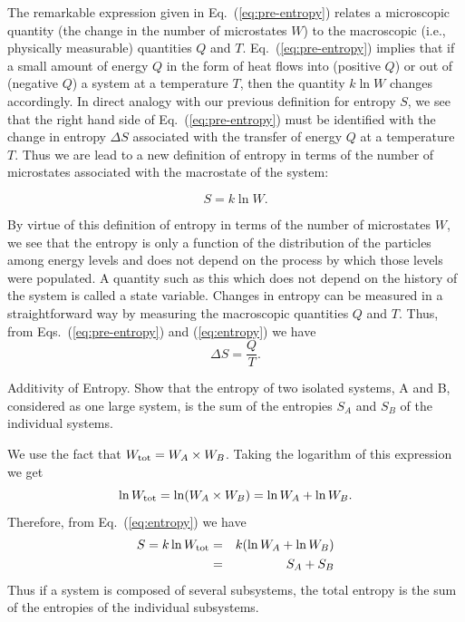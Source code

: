 The remarkable expression given in Eq.~(\ref{eq:pre-entropy}) relates
a microscopic quantity (the change in the number of microstates $W$)
to the macroscopic (i.e., physically measurable) quantities $Q$ and
$T$.  Eq.~(\ref{eq:pre-entropy}) implies that if a small amount of
energy $Q$ in the form of heat flows into (positive $Q$) or out of
(negative $Q$) a system at a temperature $T$, then the quantity $k \ln
W$ changes accordingly.  In direct analogy with our previous
definition for entropy $S$, we see that the right hand side of
Eq.~(\ref{eq:pre-entropy}) must be identified with the change in
entropy $\Delta S$ associated with the transfer of energy $Q$ at a
temperature $T$.  Thus we are lead to a new definition of entropy in
terms of the number of microstates associated with the macrostate of
the system:

\begin{boxiteq}
{
\begin{equation}
S = k \ln W.
\label{eq:entropy}
\end{equation}
}
\end{boxiteq}
\vspace{-.1in}

By virtue of this definition of entropy in terms of the number of
microstates $W$, we see that the entropy is only a function of the
distribution of the particles among energy levels and does not depend
on the process by which those levels were populated.  A quantity such
as this which does not depend on the history of the system is
called a state variable.  Changes in entropy can be measured in a
straightforward way by measuring the macroscopic quantities $Q$ and
$T$.  Thus, from Eqs.~(\ref{eq:pre-entropy}) and (\ref{eq:entropy}) we
have
\begin{equation}
\Delta S = \frac{Q}{T}.
\label{eq:deltaS}
\end{equation}


\begin{example}{Additivity of Entropy.}  
Show that the entropy of two isolated
systems, A and B, considered as one large system, is the sum of the
entropies $S_A$ and $S_B$ of the individual systems.

\solution
We use the fact that $W_{\rm tot}= W_A\times W_B$.  Taking the
logarithm of this expression we get
\begin{equation}
\ln W_{\rm tot} = \ln(W_A \times W_B) = \ln W_A + \ln W_B.
\end{equation}
Therefore, from Eq.~(\ref{eq:entropy}) we have
\begin{eqnarray}
S =k \ln W_{\rm tot} &=& k (\ln W_A + \ln W_B) \nonumber \\
  &=& S_A + S_B 
\end{eqnarray}
Thus if a system is composed of several subsystems, the total entropy
is the sum of the entropies of the individual subsystems.
\end{example}
  
